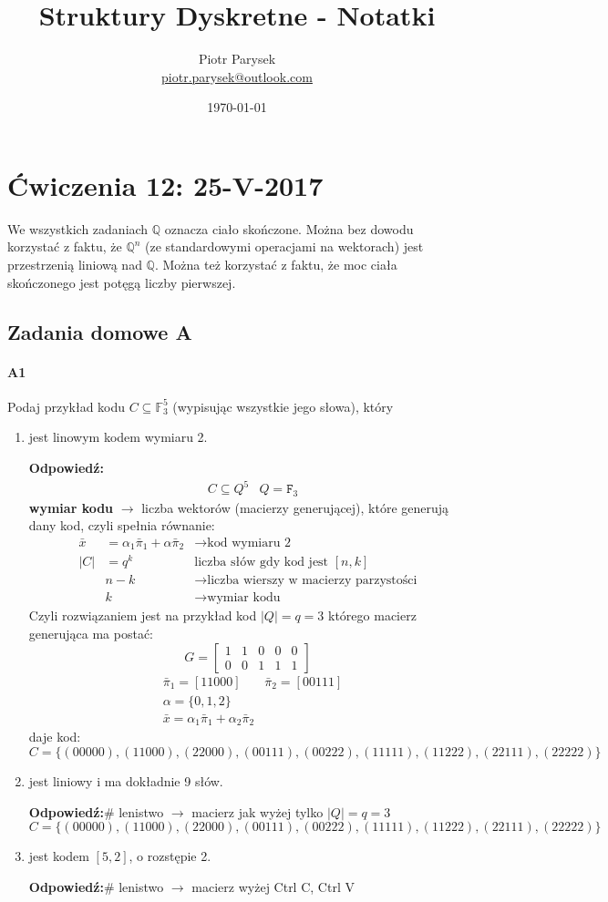 \documentclass[a4paper,12pt]{article}
\title{Struktury Dyskretne - Notatki}
\author{Piotr Parysek\\
\href{mailto:piotr.parysek@outlook.com}{piotr.parysek@outlook.com} }
\date{\today}
\theoremstyle{definition}%
\theoremstyle{definition}
\theoremstyle{problem}
\begin{document}
\maketitle

\tableofcontents
\section{Ćwiczenia 12: 25-V-2017}
We wszystkich zadaniach $\mathbb{Q}$ oznacza ciało skończone. Można bez dowodu korzystać z faktu, że $\mathbb{Q}^n$ (ze standardowymi operacjami na wektorach) jest przestrzenią liniową nad $\mathbb{Q}$. Można też korzystać z faktu, że moc ciała skończonego jest potęgą liczby pierwszej.

\subsection{Zadania domowe A}
\paragraph{A1} Podaj przykład kodu $C\subseteq \mathbb{F}^5_3$ (wypisując wszystkie jego słowa), który
\begin{enumerate}[label=\alph*)]
\item jest linowym kodem wymiaru 2.

\textbf{Odpowiedź:}
\begin{align*}
&C\subseteq Q^5& Q=\mathtt{F}_3
\end{align*}
\textbf{wymiar kodu} $\rightarrow$ liczba wektorów (macierzy generującej), które generują dany kod, czyli spełnia równanie:
\begin{align*}
\bar{x}&= \alpha _1\bar{\pi}_1 + \alpha\bar{\pi}_2 &\rightarrow\text{kod wymiaru 2}\\
|C|&=q^k &\text{liczba słów gdy kod jest }[n,k]\\
&n-k&\rightarrow\text{liczba wierszy w macierzy parzystości}\\
&k&\rightarrow\text{wymiar kodu}
\end{align*}
Czyli rozwiązaniem jest na przykład kod $|Q|=q=3$ którego macierz generująca ma postać:
$$G=\begin{bmatrix}
1&1&0&0&0\\0&0&1&1&1
\end{bmatrix}$$ 
\begin{align*}
&\bar{\pi}_1=[11000] &\bar{\pi}_2=[00111]\\
&\alpha =\{0,1,2\}\\
&\bar{x}=\alpha_1\bar{\pi}_1+\alpha_2\bar{\pi}_2
\end{align*}
daje kod:
$$C=\{(00000),(11000),(22000),(00111),(00222),(11111),(11222),(22111),(22222)\}$$
\item jest liniowy i ma dokładnie 9 słów.

\textbf{Odpowiedź:}\# lenistwo $\rightarrow$ macierz jak wyżej tylko $|Q|=q=3$
$$C=\{(00000),(11000),(22000),(00111),(00222),(11111),(11222),(22111),(22222)\}$$
\item jest kodem $[5, 2]$, o rozstępie 2.

\textbf{Odpowiedź:}\# lenistwo $\rightarrow$ macierz wyżej Ctrl C, Ctrl V
\end{enumerate}
\end{document}
